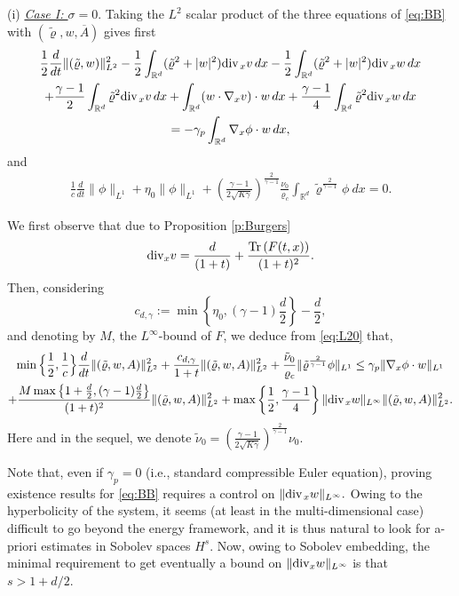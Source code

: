 \documentclass[11pt,twoside]{amsart}
\newcommand{\Div}{{\rm div}_x}
\newcommand{\tildrho}{\tilde{\varrho}}
\newcommand\R{\mathbb{R}}
\newcommand{\Tr}{\hbox{\rm{Tr}\,}}
\renewcommand{\div}{\mbox{\rm div}\;\!}
\begin{document}
(i) \underline{\em Case I:  $\sigma=0$}.  Taking the $L^2$ 
scalar product of the three equations of \eqref{eq:BB} with $(\tilde\varrho,w,\overline A)$ gives first
\begin{multline}\label{eq:L20}
\frac12\frac d{dt}\|(\tilde\varrho,w)\|_{L^2}^2-\frac12\int_{\R^d}(\tilde\varrho^2+|w|^2)\div_x v\,dx
-\frac12\int_{\R^d}(\tilde\varrho^2+|w|^2)\div_x w\,dx \\
+\frac{\gamma-1}2\int_{\R^d}\tilde\varrho^2\div_x v\,dx
+\int_{\R^d}(w\cdot\nabla_x v)\cdot w\,dx +\frac{\gamma-1}4 \int_{\R^d} \tilde\varrho^2 \div_x w\, dx \\
= -\gamma_p\int_{\R^d}\nabla_x\phi\cdot w\,dx,
\end{multline}
and
\begin{align}\label{eq:L21}
\frac{1}{c}\frac{d}{dt}\|\phi\|_{L^1}
+\eta_0\|\phi\|_{L^1}
+\left(\frac{\gamma-1}{2\sqrt{K\gamma}}\right)^{\frac{2}{\gamma-1}}\frac{\nu_0}{\varrho_c}\int_{\R^d}\tilde\varrho^{\frac{2}{\gamma-1}} \phi \ dx=0.
\end{align} 

We first observe that due to Proposition \ref{p:Burgers}
\begin{align*}
\Div v = \frac{d}{(1+t)}  + \frac{\Tr(F(t,x))}{(1+t)^2} .
\end{align*}
Then, considering 
\begin{equation}\label{eq:cdg} c_{d,\gamma}:= \min\left\{\eta_0,{(\gamma-1)}\frac{d}{2}\right\}-\frac d2 ,
\end{equation}
{}and  denoting by $M$,  the $L^\infty$-bound of $F$,   we deduce from \eqref{eq:L20} that,
\begin{multline}\label{eq:L2}
\min\Big\{\frac12, \frac1c\Big\}
\frac{d}{dt}\|(\tildrho,w,A)\|_{L^2}^2 + \frac{c_{d,\gamma}}{1+t}\|(\tildrho,w,A)\|_{L^2}^2
+\frac{\tilde\nu_0}{\varrho_c}\|\tildrho^{\frac{2}{\gamma-1}} \phi\|_{L^1} 
\leq
\gamma_p\|\nabla_x\phi\cdot w\|_{L^1}
\\+\frac{M\max\left\{1+\frac d2, (\gamma-1)\frac d2\right\}}{(1+t)^2}\|(\tildrho,w,A)\|_{L^2}^2+\max\left\{\frac12,\frac{\gamma-1}4\right\}\|\div_x w\|_{L^\infty}\|(\tildrho,w,A)\|_{L^2}^2.
\end{multline}
Here and in the sequel, we denote $\displaystyle \tilde \nu_0 = \left(\frac{\gamma-1}{2\sqrt{K\gamma}}\right)^{\frac{2}{\gamma-1}} \nu_0$. 


Note that, even if  $\gamma_p=0$ (i.e., standard compressible Euler equation), proving existence results for \eqref{eq:BB} 
requires a control on $\|\div_x w\|_{L^\infty}.$ Owing to the hyperbolicity of the system, 
it seems (at least in the multi-dimensional case) difficult to go beyond the energy framework, 
and it is thus natural to look for a-priori estimates in  Sobolev spaces $H^s.$
Now, owing to Sobolev embedding, the minimal requirement to get eventually a bound on 
 $\|\Div w\|_{L^\infty}$ is that $s>1+d/2.$ 
\end{document}
